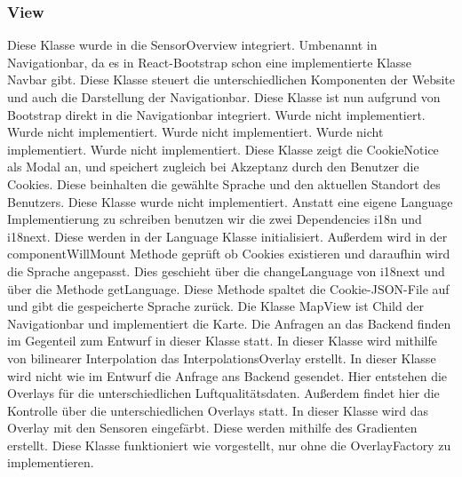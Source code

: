 \subsubsection{View}
    Diese Klasse wurde in die SensorOverview integriert.
    Umbenannt in Navigationbar, da es in React-\gls{Bootstrap} schon eine implementierte Klasse Navbar gibt.
    Diese Klasse steuert die unterschiedlichen Komponenten der Website und auch die Darstellung der Navigationbar.
    \removedClass
    Diese Klasse ist nun aufgrund von \gls{Bootstrap} direkt in die Navigationbar integriert.
    \removedClass
{}
    Wurde nicht implementiert. 
Wurde nicht implementiert. 
Wurde nicht implementiert. 
Wurde nicht implementiert. 
Wurde nicht implementiert. 
    \noChange
{}
    Diese Klasse zeigt die \gls{Cookie}Notice als Modal an, und speichert zugleich bei Akzeptanz durch den Benutzer die \gls{Cookie}s.
    Diese beinhalten die gewählte Sprache und den aktuellen Standort des Benutzers.
    Diese Klasse wurde nicht implementiert.
    Anstatt eine eigene Language Implementierung zu schreiben benutzen wir die zwei Dependencies i18n und i18next.
    Diese werden in der Language Klasse initialisiert. 
    Außerdem wird in der componentWillMount Methode geprüft ob \gls{Cookie}s existieren und daraufhin wird die Sprache angepasst. Dies geschieht über die changeLanguage von i18next und über die Methode getLanguage.
    Diese Methode spaltet die \gls{Cookie}-\gls{JSON}-File auf und gibt die gespeicherte Sprache zurück.
    Die Klasse MapView ist Child der Navigationbar und implementiert die Karte. Die Anfragen an das Backend finden im Gegenteil zum Entwurf in dieser Klasse statt. 
    \removedClass
{}
    In dieser Klasse wird mithilfe von bilinearer Interpolation das InterpolationsOverlay erstellt.
    In dieser Klasse wird nicht wie im Entwurf die Anfrage ans Backend gesendet. Hier entstehen die Overlays für die unterschiedlichen Luftqualitätsdaten.
    Außerdem findet hier die Kontrolle über die unterschiedlichen Overlays statt.
    \removedClass
{}
    In dieser Klasse wird das Overlay mit den Sensoren eingefärbt. Diese werden mithilfe des Gradienten erstellt.
    Diese Klasse funktioniert wie vorgestellt, nur ohne die OverlayFactory zu implementieren.
